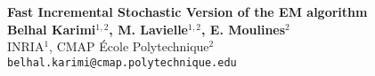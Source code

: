 \documentclass[a0,portrait]{a0poster}
\begin{document}


\begin{minipage}[b]{0.75\linewidth}
\veryHuge \color{Navy} \textbf{Fast Incremental Stochastic Version of the EM algorithm} \color{Black}\\[2cm] %
\huge \textbf{Belhal Karimi$^{1,2}$, M. Lavielle$^{1,2}$, E. Moulines$^{2}$}\\[0.5cm] %
\huge INRIA$^1$, CMAP École Polytechnique$^2$\\[0.4cm] %
\Large \texttt{belhal.karimi@cmap.polytechnique.edu}\\
\end{minipage}
%
\begin{minipage}[b]{0.25\linewidth}

\begin{center}
\end{center}
\end{minipage}

\vspace{1cm} %

\end{document}
